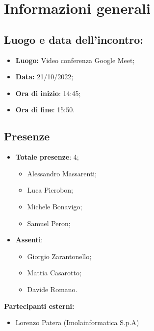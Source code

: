 \section{Informazioni generali}

\subsection{Luogo e data dell'incontro:}
\begin{itemize}
    \item \textbf{Luogo:} Video conferenza Google Meet;
    \item \textbf{Data:} 21/10/2022;
    \item \textbf{Ora di inizio}: 14:45;
    \item \textbf{Ora di fine}: 15:50.
\end{itemize}
\subsection{Presenze}
\begin{itemize}
    \item \textbf{Totale presenze}: 4;
    \begin{itemize}
        \item Alessandro Massarenti;
        \item Luca Pierobon;
        \item Michele Bonavigo;
        \item Samuel Peron;
    \end{itemize}
    \item \textbf{Assenti}:
    \begin{itemize}
        \item Giorgio Zarantonello;
        \item Mattia Casarotto;
        \item Davide Romano.
    \end{itemize}
\end{itemize}
\item \textbf{Partecipanti esterni:}
\begin{itemize}
    \item Lorenzo Patera (Imolainformatica S.p.A)
\end{itemize}